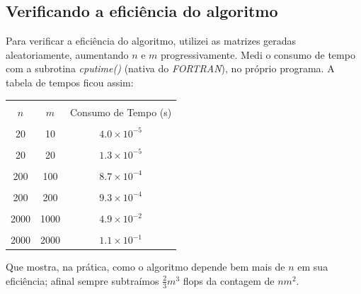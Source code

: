 \documentclass[a4paper,11pt]{article}
\begin{document}
    \subsection{Verificando a eficiência do algoritmo}
        Para verificar a eficiência do algoritmo, utilizei as matrizes geradas aleatoriamente, aumentando $n$ e $m$ progressivamente. Medi o consumo de tempo com a subrotina \textit{cputime()} (nativa do \textit{FORTRAN}), no próprio programa. A tabela de tempos ficou assim:
        \begin{center}
            \begin{tabular}{ | c | c | c |} 
                \hline
                & & \\ [-1em]
                $n$ & $m$ & Consumo de Tempo (s)\\  [+.5em]
                \hline\hline
                & & \\ [-1em]
                20 & 10 & $4.0 \times 10^{-5}$\\ [+.5em]
                \hline
                & & \\ [-1em]
                20 & 20 & $1.3 \times 10^{-5}$\\ [+.5em]
                \hline
                & & \\ [-1em]
                200 & 100 & $8.7 \times 10^{-4}$\\ [+.5em]
                \hline
                & & \\ [-1em]
                200 & 200 & $9.3 \times 10^{-4}$\\ [+.5em]
                \hline
                & & \\ [-1em]
                2000 & 1000 & $4.9 \times 10^{-2}$\\ [+.5em]
                \hline
                & & \\ [-1em]
                2000 & 2000 & $1.1 \times 10^{-1}$\\ [+.5em]
                \hline
            \end{tabular}
        \end{center}
        Que mostra, na prática, como o algoritmo depende bem mais de $n$ em sua eficiência; afinal sempre subtraímos $\frac{2}{3}m^3$ flops da contagem de $nm^2$.
            
\end{document}
